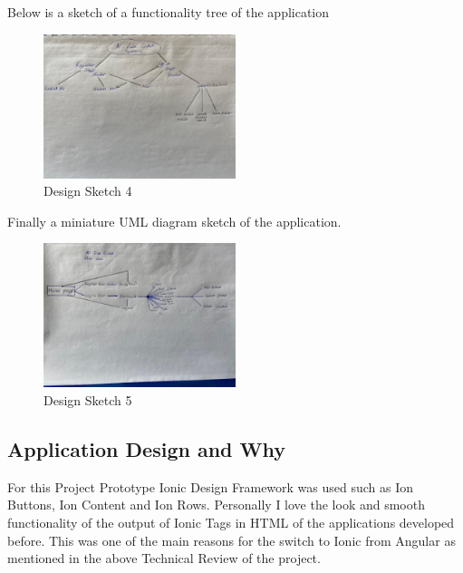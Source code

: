 Below is a sketch of a functionality tree of the application
\begin{figure}[h!]
	\caption{Design Sketch 4}
	\label{image:sketch4}
	\centering
	\includegraphics[width=0.5\textwidth]{images/sketch4.jpg}
\end{figure}

Finally a miniature UML diagram sketch of the application. 

\begin{figure}[h!]
	\caption{Design Sketch 5}
	\label{image:sketch5}
	\centering
	\includegraphics[width=0.5\textwidth]{images/sketch5.jpg}
\end{figure}
\newpage

\subsection{Application Design and Why}
For this Project Prototype Ionic Design Framework was used such as Ion Buttons, Ion Content and Ion Rows. Personally I love the look and smooth functionality of the output of Ionic Tags in HTML of the applications developed before. This was one of the main reasons for the switch to Ionic from Angular as mentioned in the above Technical Review of the project. 
\newline

